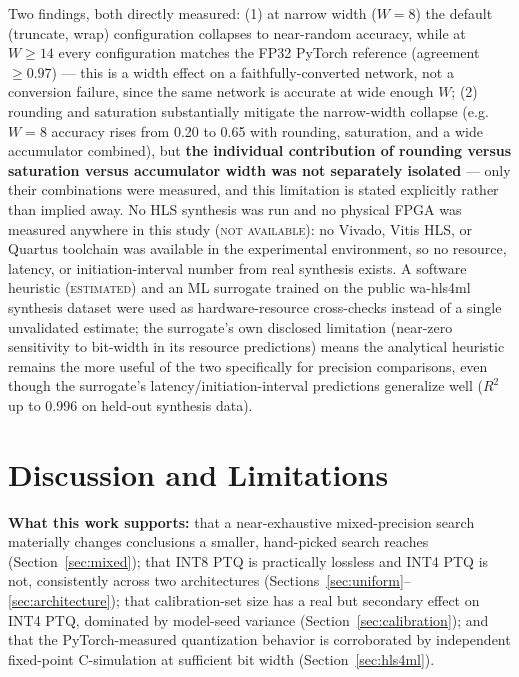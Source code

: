 \documentclass[11pt]{article}
\newcommand{\tiere}{\textsc{estimated}}
\newcommand{\tiern}{\textsc{not available}}
\begin{document}
Two findings, both directly measured: (1) at narrow width ($W{=}8$) the default (truncate, wrap)
configuration collapses to near-random accuracy, while at $W{\geq}14$ every configuration matches the
FP32 PyTorch reference (agreement $\geq 0.97$) --- this is a width effect on a faithfully-converted
network, not a conversion failure, since the same network is accurate at wide enough $W$; (2) rounding
and saturation substantially mitigate the narrow-width collapse (e.g.\ $W{=}8$ accuracy rises from
0.20 to 0.65 with rounding, saturation, and a wide accumulator combined), but \textbf{the individual
contribution of rounding versus saturation versus accumulator width was not separately isolated} ---
only their combinations were measured, and this limitation is stated explicitly rather than implied
away. No HLS synthesis was run and no physical FPGA was measured anywhere in this study (\tiern{}): no
Vivado, Vitis HLS, or Quartus toolchain was available in the experimental environment, so no resource,
latency, or initiation-interval number from real synthesis exists. A software heuristic (\tiere{}) and
an ML surrogate trained on the public wa-hls4ml synthesis dataset \citep{hawks2025wahls4ml} were used
as hardware-resource cross-checks instead of a single unvalidated estimate; the surrogate's own
disclosed limitation (near-zero sensitivity to bit-width in its resource predictions) means the
analytical heuristic remains the more useful of the two specifically for precision comparisons, even
though the surrogate's latency/initiation-interval predictions generalize well ($R^2$ up to 0.996 on
held-out synthesis data).

\section{Discussion and Limitations}

\textbf{What this work supports:} that a near-exhaustive mixed-precision search materially changes
conclusions a smaller, hand-picked search reaches (Section~\ref{sec:mixed}); that INT8 PTQ is
practically lossless and INT4 PTQ is not, consistently across two architectures
(Sections~\ref{sec:uniform}--\ref{sec:architecture}); that calibration-set size has a real but
secondary effect on INT4 PTQ, dominated by model-seed variance (Section~\ref{sec:calibration}); and
that the PyTorch-measured quantization behavior is corroborated by independent fixed-point
C-simulation at sufficient bit width (Section~\ref{sec:hls4ml}).
\end{document}

